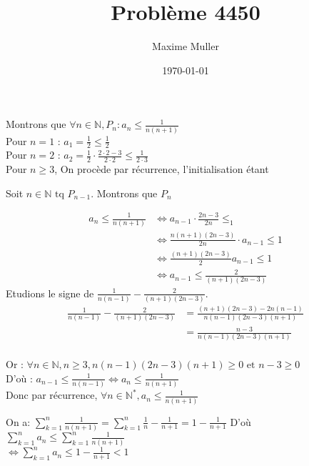 \documentclass{article}
\title{Problème 4450}
\author{Maxime Muller}
\date{\today}
\begin{document}
\maketitle

Montrons que \(\forall n \in \mathbb{N}, P_n : a_n \leq \frac{1}{n(n+1)}\)\\

Pour \(n=1\) : \(a_1 = \frac{1}{2}\leq \frac{1}{2}\)\\

Pour \(n=2\) : \(a_2 = \frac{1}{2}\cdot \frac{2\cdot 2-3}{2\cdot 2}\leq \frac{1}{2\cdot 3}\)\\
Pour \(n\geq 3\), On procède par récurrence, l'initialisation étant

Soit \(n\in \mathbb{N} \text{ tq } P_{n-1}\). Montrons que \(P_n\)

\begin{align*}
    a_n \leq \frac{1}{n(n+1)} &\Leftrightarrow a_{n-1} \cdot \frac{2n-3}{2n}\leq_1\\
    &\Leftrightarrow \frac{n(n+1)(2n-3)}{2n} \cdot a_{n-1} \leq 1\\
    &\Leftrightarrow \frac{(n+1)(2n-3)}{2} a_{n-1} \leq 1\\
    &\Leftrightarrow a_{n-1} \leq \frac{2}{(n+1)(2n-3)}
\end{align*}
Etudions le signe de \(\frac{1}{n(n-1)} - \frac{2}{(n+1)(2n-3)}\).\\
\begin{align*}
    \frac{1}{n(n-1)} - \frac{2}{(n+1)(2n-3)} &= \frac{(n+1)(2n-3)-2n(n-1)}{n(n-1)(2n-3)(n+1)} \\
    &= \frac{n-3}{n(n-1)(2n-3)(n+1)} \\
\end{align*}

Or : \(\forall n \in \mathbb{N}, n\geq 3, n(n-1)(2n-3)(n+1)\geq 0 \text{ et } n-3\geq 0 \)\\
D'où : \(a_{n-1} \leq \frac{1}{n(n-1)} \Leftrightarrow a_n \leq \frac{1}{n(n+1)}\)\\
Donc par récurrence, \(\forall n \in \mathbb{N}^{*}, a_n \leq \frac{1}{n(n+1)}\)

On a: \(\sum_{k=1}^{n} \frac{1}{n(n+1)} = \sum_{k=1}^{n} \frac{1}{n}-\frac{1}{n+1} = 1-\frac{1}{n+1}\)
D'où \(\sum_{k=1}^{n} a_n \leq \sum_{k=1}^{n} \frac{1}{n(n+1)}\)\\
\(\Leftrightarrow \sum_{k=1}^{n} a_n \leq 1 - \frac{1}{n+1} < 1\)
\end{document}
